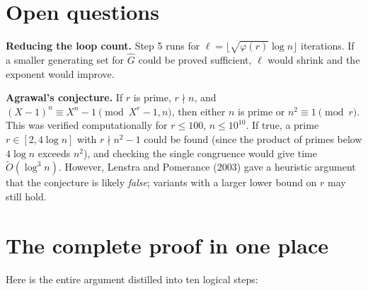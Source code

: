 \documentclass[12pt]{article}
\newcommand{\OO}{\widetilde{O}}
\begin{document}
\section{Open questions}

\textbf{Reducing the loop count.} Step 5 runs for $\ell=\lfloor\sqrt{\varphi(r)}\log n\rfloor$ iterations. If a smaller generating set for $\hat{G}$ could be proved sufficient, $\ell$ would shrink and the exponent would improve.

\textbf{Agrawal's conjecture.} If $r$ is prime, $r\nmid n$, and $(X-1)^n\equiv X^n-1\pmod{X^r-1,n}$, then either $n$ is prime or $n^2\equiv 1\pmod{r}$. This was verified computationally for $r\leq 100$, $n\leq 10^{10}$. If true, a prime $r\in[2,4\log n]$ with $r\nmid n^2-1$ could be found (since the product of primes below $4\log n$ exceeds $n^2$), and checking the single congruence would give time $\OO(\log^3 n)$. However, Lenstra and Pomerance (2003) gave a heuristic argument that the conjecture is likely \emph{false}; variants with a larger lower bound on $r$ may still hold.

\section{The complete proof in one place}

Here is the entire argument distilled into ten logical steps:
\end{document}

